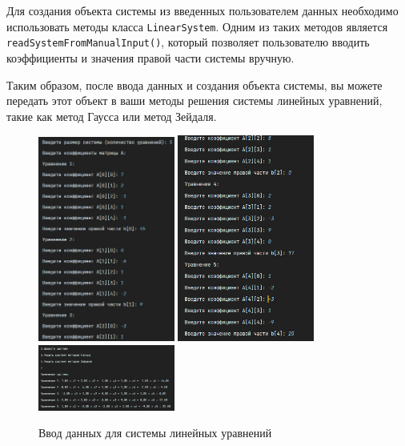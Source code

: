 \documentclass[12pt]{article}
\begin{document}
Для создания объекта системы из введенных пользователем данных необходимо использовать методы класса \texttt{LinearSystem}. Одним из таких методов является \texttt{readSystemFromManualInput()}, который позволяет пользователю вводить коэффициенты и значения правой части системы вручную.

Таким образом, после ввода данных и создания объекта системы, вы можете передать этот объект в ваши методы решения системы линейных уравнений, такие как метод Гаусса или метод Зейдаля.

\clearpage

\begin{figure}[ht]
  \centering
  {\includegraphics[width=0.4\textwidth]{system_input1.png}}
  \hfill
  {\includegraphics[width=0.4\textwidth]{system_input2.png}}
  \hfill
  {\includegraphics[width=0.4\textwidth]{system_input3.png}}
  \caption{Ввод данных для системы линейных уравнений}
\end{figure}
\end{document}
